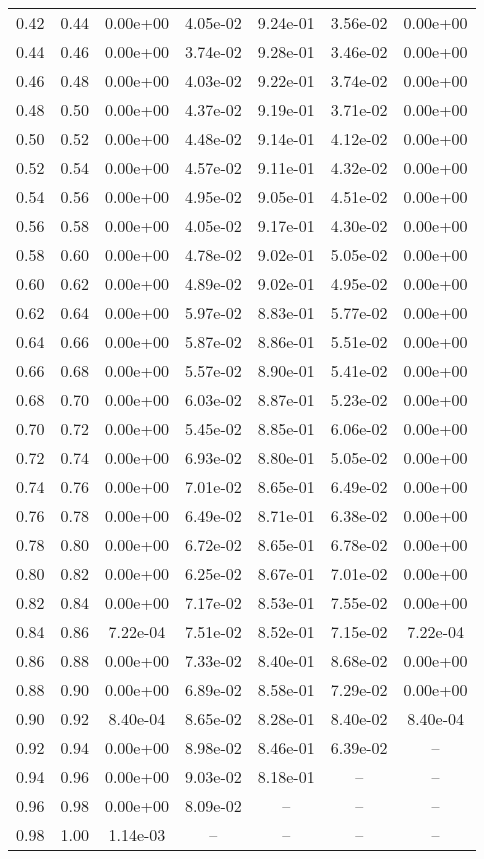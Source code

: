 \begin{tabular}{|cc||ccccc|}
 0.42 &  0.44 & 0.00e+00 & 4.05e-02 & 9.24e-01 & 3.56e-02 & 0.00e+00\\
 0.44 &  0.46 & 0.00e+00 & 3.74e-02 & 9.28e-01 & 3.46e-02 & 0.00e+00\\
 0.46 &  0.48 & 0.00e+00 & 4.03e-02 & 9.22e-01 & 3.74e-02 & 0.00e+00\\
 0.48 &  0.50 & 0.00e+00 & 4.37e-02 & 9.19e-01 & 3.71e-02 & 0.00e+00\\
 0.50 &  0.52 & 0.00e+00 & 4.48e-02 & 9.14e-01 & 4.12e-02 & 0.00e+00\\
 0.52 &  0.54 & 0.00e+00 & 4.57e-02 & 9.11e-01 & 4.32e-02 & 0.00e+00\\
 0.54 &  0.56 & 0.00e+00 & 4.95e-02 & 9.05e-01 & 4.51e-02 & 0.00e+00\\
 0.56 &  0.58 & 0.00e+00 & 4.05e-02 & 9.17e-01 & 4.30e-02 & 0.00e+00\\
 0.58 &  0.60 & 0.00e+00 & 4.78e-02 & 9.02e-01 & 5.05e-02 & 0.00e+00\\
 0.60 &  0.62 & 0.00e+00 & 4.89e-02 & 9.02e-01 & 4.95e-02 & 0.00e+00\\
 0.62 &  0.64 & 0.00e+00 & 5.97e-02 & 8.83e-01 & 5.77e-02 & 0.00e+00\\
 0.64 &  0.66 & 0.00e+00 & 5.87e-02 & 8.86e-01 & 5.51e-02 & 0.00e+00\\
 0.66 &  0.68 & 0.00e+00 & 5.57e-02 & 8.90e-01 & 5.41e-02 & 0.00e+00\\
 0.68 &  0.70 & 0.00e+00 & 6.03e-02 & 8.87e-01 & 5.23e-02 & 0.00e+00\\
 0.70 &  0.72 & 0.00e+00 & 5.45e-02 & 8.85e-01 & 6.06e-02 & 0.00e+00\\
 0.72 &  0.74 & 0.00e+00 & 6.93e-02 & 8.80e-01 & 5.05e-02 & 0.00e+00\\
 0.74 &  0.76 & 0.00e+00 & 7.01e-02 & 8.65e-01 & 6.49e-02 & 0.00e+00\\
 0.76 &  0.78 & 0.00e+00 & 6.49e-02 & 8.71e-01 & 6.38e-02 & 0.00e+00\\
 0.78 &  0.80 & 0.00e+00 & 6.72e-02 & 8.65e-01 & 6.78e-02 & 0.00e+00\\
 0.80 &  0.82 & 0.00e+00 & 6.25e-02 & 8.67e-01 & 7.01e-02 & 0.00e+00\\
 0.82 &  0.84 & 0.00e+00 & 7.17e-02 & 8.53e-01 & 7.55e-02 & 0.00e+00\\
 0.84 &  0.86 & 7.22e-04 & 7.51e-02 & 8.52e-01 & 7.15e-02 & 7.22e-04\\
 0.86 &  0.88 & 0.00e+00 & 7.33e-02 & 8.40e-01 & 8.68e-02 & 0.00e+00\\
 0.88 &  0.90 & 0.00e+00 & 6.89e-02 & 8.58e-01 & 7.29e-02 & 0.00e+00\\
 0.90 &  0.92 & 8.40e-04 & 8.65e-02 & 8.28e-01 & 8.40e-02 & 8.40e-04\\
 0.92 &  0.94 & 0.00e+00 & 8.98e-02 & 8.46e-01 & 6.39e-02 &  -- \\
 0.94 &  0.96 & 0.00e+00 & 9.03e-02 & 8.18e-01 &  --  &  -- \\
 0.96 &  0.98 & 0.00e+00 & 8.09e-02 &  --  &  --  &  -- \\
 0.98 &  1.00 & 1.14e-03 &  --  &  --  &  --  &  -- \\
\hline
\end{tabular}
